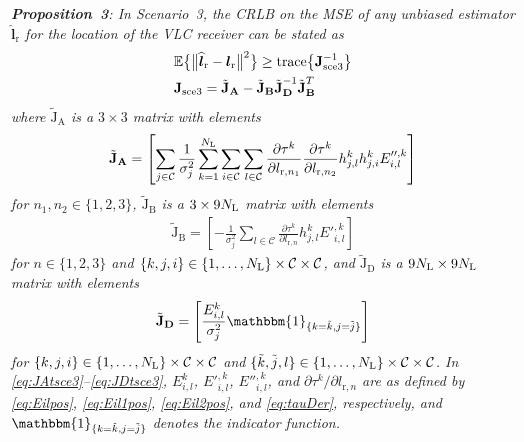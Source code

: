 \documentclass[10pt,twocolumn]{IEEEtran}
\newcommand{\NL}{N_{\rm{L}}}
\newcommand{\mtC}{{\mathcal{C}}}
\newcommand{\expectation}{{\mathbb{E}}}
\newcommand{\lr}{{\boldsymbol{l}_{\mathrm{r}}}}
\newcommand{\lrh}{{\widehat{\boldsymbol{l}}_{\mathrm{r}}}}
\newcommand{\lrs}[1]{{l_{\mathrm{r},#1}}}
\newcommand{\JsyniT}{{\boldsymbol{\mathrm{J}}_{\mathrm{sce3}}^{-1}}}
\newcommand{\JsynT}{{\boldsymbol{\mathrm{J}}_{\mathrm{sce3}}}}
\newcommand{\JAt}{\tilde{{\boldsymbol{\mathrm{J}}}}_{\boldsymbol{\mathrm{A}}}}
\newcommand{\JBt}{\tilde{{\boldsymbol{\mathrm{J}}}}_{\boldsymbol{\mathrm{B}}}}
\newcommand{\JDt}{\tilde{{\boldsymbol{\mathrm{J}}}}_{\boldsymbol{\mathrm{D}}}}
\newcommand{\JDti}{\tilde{{\boldsymbol{\mathrm{J}}}}_{\boldsymbol{\mathrm{D}}}^{-1}}
\begin{document}
\textit{\textbf{Proposition~3}: In Scenario~3, the CRLB on the MSE of any unbiased estimator $\lrh$ for the location of the VLC receiver can be stated as}
\begin{align}\label{eq:CRLBsce3}
&\expectation \big\{ \big\|\lrh - \lr \big\|^2 \big\}\geq{\rm{trace}}\big\{\JsyniT\big\}
\\\label{eq:Sce3blockFIM}
&\JsynT=\JAt-\JBt\JDti\JBt^T
\end{align}
\textit{where $\JAt$ is a $3\times3$ matrix with elements}
\begin{gather}\label{eq:JAtsce3}
\JAt=\left[\sum_{j\in{\mtC}}\frac{1}{\sigma_j^2}\sum_{k=1}^{\NL}\sum_{i\in{\mtC}}
\sum_{l\in{\mtC}}\frac{\partial \tau^k}{\partial \lrs{n_1}}\frac{\partial \tau^k}{\partial \lrs{n_2}}h^k_{j,l}h^k_{j,i}E''^{,k}_{i,l}\right]
\end{gather}
\textit{for $n_1,n_2\in\{1,2,3\}$, $\JBt$ is a $3\times9\NL$ matrix with elements}
\begin{gather}\label{eq:JBtsce3}
\JBt=\left[-\frac{1}{\sigma_j^2}\sum_{l\in{\mtC}}\frac{\partial \tau^k}{\partial \lrs{n}}h^k_{j,l}E'^{,k}_{i,l}\right]
\end{gather}
\textit{for $n\in\{1,2,3\}$ and $\{k,j,i\}\in\{1,\ldots,\NL\}\times\mtC\times\mtC$, and $\JDt$ is a $9\NL\times9\NL$ matrix with elements}
\begin{gather}\label{eq:JDtsce3}
\JDt=\left[\frac{E^k_{i,l}}{\sigma_j^2}\mathbbm{1}_{\{k=\tilde{k}, j=\tilde{j}\}}\right]
\end{gather}
\textit{for $\{k,j,i\}\in\{1,\ldots,\NL\}\times\mtC\times\mtC$ and $\{\tilde{k},\tilde{j},l\}\in\{1,\ldots,\NL\}\times\mtC\times\mtC$. In \eqref{eq:JAtsce3}--\eqref{eq:JDtsce3}, $E^k_{i,l}$, $E'^{,k}_{i,l}$, $E''^{,k}_{i,l}$, and ${\partial \tau^k}/{\partial \lrs{n}}$ are as defined by \eqref{eq:Eilpos}, \eqref{eq:Eil1pos}, \eqref{eq:Eil2pos}, and \eqref{eq:tauDer}, respectively, and $\mathbbm{1}_{\{k=\tilde{k}, j=\tilde{j}\}}$ denotes the indicator function.}
\end{document}
